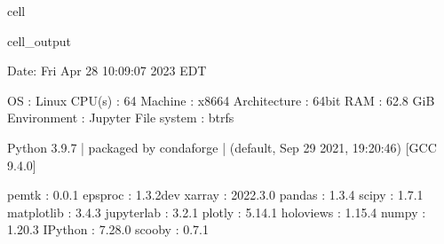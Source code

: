 \documentclass[letterpaper,table,10pt,english]{jupyterBook}
\begin{document}
\begin{sphinxuseclass}{cell}
\begin{sphinxVerbatimOutput}
\begin{sphinxuseclass}{cell_output}
\begin{sphinxVerbatim}[commandchars=\\\{\}]
\PYGZhy{}\PYGZhy{}\PYGZhy{}\PYGZhy{}\PYGZhy{}\PYGZhy{}\PYGZhy{}\PYGZhy{}\PYGZhy{}\PYGZhy{}\PYGZhy{}\PYGZhy{}\PYGZhy{}\PYGZhy{}\PYGZhy{}\PYGZhy{}\PYGZhy{}\PYGZhy{}\PYGZhy{}\PYGZhy{}\PYGZhy{}\PYGZhy{}\PYGZhy{}\PYGZhy{}\PYGZhy{}\PYGZhy{}\PYGZhy{}\PYGZhy{}\PYGZhy{}\PYGZhy{}\PYGZhy{}\PYGZhy{}\PYGZhy{}\PYGZhy{}\PYGZhy{}\PYGZhy{}\PYGZhy{}\PYGZhy{}\PYGZhy{}\PYGZhy{}\PYGZhy{}\PYGZhy{}\PYGZhy{}\PYGZhy{}\PYGZhy{}\PYGZhy{}\PYGZhy{}\PYGZhy{}\PYGZhy{}\PYGZhy{}\PYGZhy{}\PYGZhy{}\PYGZhy{}\PYGZhy{}\PYGZhy{}\PYGZhy{}\PYGZhy{}\PYGZhy{}\PYGZhy{}\PYGZhy{}\PYGZhy{}\PYGZhy{}\PYGZhy{}\PYGZhy{}\PYGZhy{}\PYGZhy{}\PYGZhy{}\PYGZhy{}\PYGZhy{}\PYGZhy{}\PYGZhy{}\PYGZhy{}\PYGZhy{}\PYGZhy{}\PYGZhy{}\PYGZhy{}\PYGZhy{}\PYGZhy{}\PYGZhy{}\PYGZhy{}
  Date: Fri Apr 28 10:09:07 2023 EDT

                OS : Linux
            CPU(s) : 64
           Machine : x86\PYGZus{}64
      Architecture : 64bit
               RAM : 62.8 GiB
       Environment : Jupyter
       File system : btrfs

  Python 3.9.7 | packaged by conda\PYGZhy{}forge | (default, Sep 29 2021, 19:20:46)
  [GCC 9.4.0]

             pemtk : 0.0.1
           epsproc : 1.3.2\PYGZhy{}dev
            xarray : 2022.3.0
            pandas : 1.3.4
             scipy : 1.7.1
        matplotlib : 3.4.3
        jupyterlab : 3.2.1
            plotly : 5.14.1
         holoviews : 1.15.4
             numpy : 1.20.3
           IPython : 7.28.0
            scooby : 0.7.1
\PYGZhy{}\PYGZhy{}\PYGZhy{}\PYGZhy{}\PYGZhy{}\PYGZhy{}\PYGZhy{}\PYGZhy{}\PYGZhy{}\PYGZhy{}\PYGZhy{}\PYGZhy{}\PYGZhy{}\PYGZhy{}\PYGZhy{}\PYGZhy{}\PYGZhy{}\PYGZhy{}\PYGZhy{}\PYGZhy{}\PYGZhy{}\PYGZhy{}\PYGZhy{}\PYGZhy{}\PYGZhy{}\PYGZhy{}\PYGZhy{}\PYGZhy{}\PYGZhy{}\PYGZhy{}\PYGZhy{}\PYGZhy{}\PYGZhy{}\PYGZhy{}\PYGZhy{}\PYGZhy{}\PYGZhy{}\PYGZhy{}\PYGZhy{}\PYGZhy{}\PYGZhy{}\PYGZhy{}\PYGZhy{}\PYGZhy{}\PYGZhy{}\PYGZhy{}\PYGZhy{}\PYGZhy{}\PYGZhy{}\PYGZhy{}\PYGZhy{}\PYGZhy{}\PYGZhy{}\PYGZhy{}\PYGZhy{}\PYGZhy{}\PYGZhy{}\PYGZhy{}\PYGZhy{}\PYGZhy{}\PYGZhy{}\PYGZhy{}\PYGZhy{}\PYGZhy{}\PYGZhy{}\PYGZhy{}\PYGZhy{}\PYGZhy{}\PYGZhy{}\PYGZhy{}\PYGZhy{}\PYGZhy{}\PYGZhy{}\PYGZhy{}\PYGZhy{}\PYGZhy{}\PYGZhy{}\PYGZhy{}\PYGZhy{}\PYGZhy{}
\end{sphinxVerbatim}

\end{sphinxuseclass}\end{sphinxVerbatimOutput}

\end{sphinxuseclass}
\end{document}
